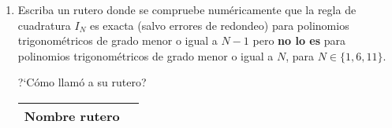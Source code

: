\documentclass[legalpaper,11pt]{article}
\begin{document}
\begin{enumerate}
\begin{enumerate}
Por ejemplo, si su funci\'on se llama \texttt{trigquad}, deber\'ia poder usarse de la siguiente manera:
\begin{lstlisting}
>> trigquad(@(x) x.^0, 10) % @(x) x.^0 es la funci\'on 1 vectorizada

ans =

    6.2832

>> trigquad(@(x) cos(3*x), 5)

ans =

   1.3951e-16
\end{lstlisting}

\medskip

?`C\'omo llam\'o a su funci\'on?

\begin{tabularx}{\linewidth}{|p{7em}|X|}\hline
Nombre funci\'on & \\\hline
\end{tabularx}

\medskip

\item {} Escriba un rutero \matlab donde se compruebe num\'ericamente que la regla de cuadratura $I_N$ es exacta (salvo errores de redondeo) para polinomios trigonom\'etricos de grado menor o igual a $N-1$ pero \textbf{no lo es} para polinomios trigonom\'etricos de grado menor o igual a $N$, para $N \in \{1, 6, 11\}$.

\medskip

?`C\'omo llam\'o a su rutero?

\begin{tabularx}{\linewidth}{|p{7em}|X|}\hline
Nombre rutero & \\\hline
\end{tabularx}




\end{enumerate}
\end{enumerate}
\end{document}
